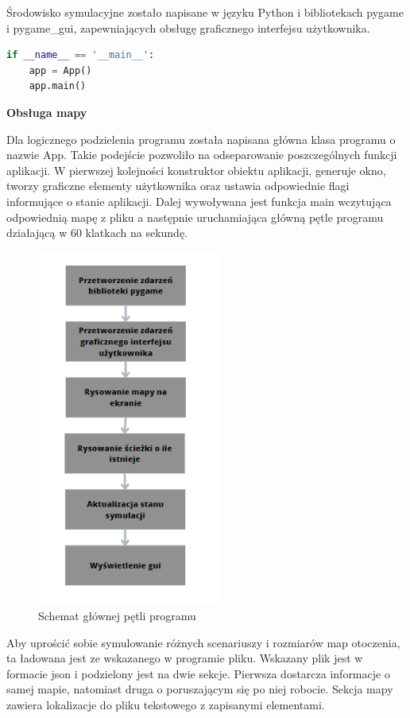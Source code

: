 Środowisko symulacyjne zostało napisane w języku Python i bibliotekach pygame\cite{dokPygame} i pygame\_gui\cite{dokPygameGui},
zapewniających obsługę graficznego interfejsu użytkownika. 
\begin{lstlisting}[language=Python,caption=Uruchomienie aplikacji,label={kodPythonStartApki}]
if __name__ == '__main__':
    app = App()
    app.main()
\end{lstlisting}

\textbf{Obsługa mapy}

Dla logicznego podzielenia programu została napisana główna klasa programu o nazwie App.
Takie podejście pozwoliło na odseparowanie poszczególnych funkcji aplikacji. 
W pierwszej kolejności konstruktor obiektu aplikacji, generuje okno, tworzy 
graficzne elementy użytkownika oraz ustawia odpowiednie flagi informujące o stanie aplikacji. 
Dalej wywoływana jest funkcja main wczytująca odpowiednią mapę z pliku a następnie uruchamiająca 
główną pętle programu działającą w 60 klatkach na sekundę.

\begin{figure}[H]
	\centering
	\includegraphics[width=6cm]{pages/implementacja/zdjecia/schematPetliApki.png}
	\caption{Schemat głównej pętli programu}
	\label{fig:schematPetliGlownej}
\end{figure}

Aby uprościć sobie symulowanie różnych scenariuszy i rozmiarów map otoczenia, ta ładowana jest ze wskazanego w 
programie pliku. Wskazany plik jest w formacie json i podzielony jest na dwie sekcje. 
Pierwsza dostarcza informacje o samej mapie, natomiast druga o poruszającym się po niej robocie. 
Sekcja mapy zawiera lokalizacje do pliku tekstowego z zapisanymi elementami. 

